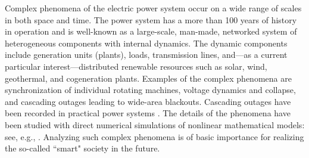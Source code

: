 \documentclass[a4paper,10pt]{article}
\begin{document}
Complex phenomena of the electric power system occur on a wide range of scales in both space and time.  
The power system has a more than 100 years of history in operation and is well-known as a large-scale, man-made, networked system of heterogeneous components with internal dynamics.  
The dynamic components include generation units (plants), loads, transmission lines, and---as a current particular interest---distributed renewable resources such as solar, wind, geothermal, and cogeneration plants.  
Examples of the complex phenomena are synchronization of individual rotating machines, voltage dynamics and collapse, and cascading outages leading to wide-area blackouts.  
Cascading outages have been recorded in practical power systems  \cite{Kurita_CDC88,Taylor_IEEECAP10,Kosterev_IEEETPS14,Sweden:2003,NorthAmerica:2003,Italy:2003,UCTE:2006,ArizonaSoCal:2011}.  
The details of the phenomena have been studied with direct numerical simulations of nonlinear mathematical models: see, e.g., \cite{Kosterev_IEEETPS14,Hiskens_IEEETPWRS14,Mani_BSDC-VI-2004,Kinney_EurPhysJ46,Dobson_CHAOS17,Susuki_IEICETEA09}.  
Analyzing such complex phenomena is of basic importance for realizing the so-called ``smart" society in the future.  
\end{document}
